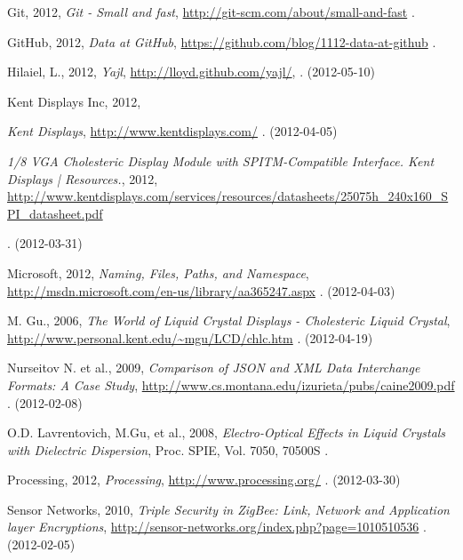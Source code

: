 \documentclass[a4paper,11pt]{article}
\newcounter{qcounter}
\begin{document}
\begin{thebibliography}{9}
\label{git}
    Git, 2012,
    \emph{Git - Small and fast},
    \url{http://git-scm.com/about/small-and-fast}
    .

\label{github}
    GitHub, 2012,
    \emph{Data at GitHub},
    \url{https://github.com/blog/1112-data-at-github}
    .

\label{hilaiel}
    Hilaiel, L., 2012, 
    \emph{Yajl},
    \url{http://lloyd.github.com/yajl/},
    . (2012-05-10)

\label{kent}
    Kent Displays Inc, 2012,
    \begin{list}{[]}{}
    \item \emph{Kent Displays},
    \url{http://www.kentdisplays.com/}
    . (2012-04-05) \\
    \item \emph{1/8 VGA Cholesteric Display Module with SPITM-Compatible Interface. Kent Displays | Resources.}, 2012,
    \url{http://www.kentdisplays.com/services/resources/datasheets/25075h_240x160_SPI_datasheet.pdf}
    \end{list}
     . (2012-03-31)

\label{microsoft}
    Microsoft, 2012,
    \emph{Naming, Files, Paths, and Namespace},
    \url{http://msdn.microsoft.com/en-us/library/aa365247.aspx}
    . (2012-04-03)

\label{mingu}
    M. Gu., 2006,
    \emph{The World of Liquid Crystal Displays - Cholesteric Liquid Crystal},
    \url{http://www.personal.kent.edu/~mgu/LCD/chlc.htm}
    . (2012-04-19)

\label{paulson}
    Nurseitov N. et al., 2009,
    \emph{Comparison of JSON and XML Data Interchange Formats: A Case Study},
    \url{http://www.cs.montana.edu/izurieta/pubs/caine2009.pdf}
    . (2012-02-08)

\label{lavrentovich}
    O.D. Lavrentovich, M.Gu, et al., 2008,
    \emph{Electro-Optical Effects in Liquid Crystals with Dielectric Dispersion},
    Proc. SPIE, 
    Vol. 7050, 70500S
    .

\label{processing}
    Processing, 2012,
    \emph{Processing},
    \url{http://www.processing.org/}
    . (2012-03-30)

\label{sensornetworks}
    Sensor Networks, 2010,
    \emph{Triple Security in ZigBee: Link, Network and Application layer Encryptions},
    \url{http://sensor-networks.org/index.php?page=1010510536}
    . (2012-02-05)


\end{thebibliography}
\end{document}
